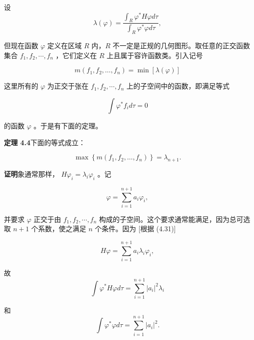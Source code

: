 设
\begin{equation*}
\lambda (\varphi) = \frac {\int_ {R} \varphi^ {*} H \varphi d \tau}{\int_ {R} \varphi^ {*} \varphi d \tau},\tag{4.28}
\end{equation*}

但现在函数 $\varphi$ 定义在区域 $R$ 内，$R$ 不一定是正规的几何图形。取任意的正交函数集合 $f_{1}, f_{2}, \cdots, f_{n}$ ，它们定义在 $R$ 上且属于容许函数类。引入记号

\begin{equation*}
m \left(f _ {1}, f _ {2}, \dots , f _ {n}\right) = \min [ \lambda (\varphi) ]\tag{4.29}
\end{equation*}

这里所有的 $\varphi$ 为正交于张在 $f_{1}, f_{2}, \cdots, f_{n}$ 上的子空间中的函数，即满足等式

\begin{equation*}
\int \varphi^ {*} f _ {i} d \tau = 0
\end{equation*}

的函数 $\varphi$ 。于是有下面的定理。

\textbf{定理 4.4}\quad 下面的等式成立：

\begin{equation*}
\max \left\{m (f _ {1}, f _ {2}, \dots , f _ {n}) \right\} = \lambda_ {n + 1}.\tag{4.30}
\end{equation*}

\textbf{证明}\quad 象通常那样， $H\varphi_{i} = \lambda_{i}\varphi_{i}$ 。记

\begin{equation*}
\varphi = \sum_ {i = 1} ^ {n + 1} a _ {i} \varphi_ {i},\tag{4.31}
\end{equation*}

并要求 $\varphi$ 正交于由 $f_{1}, f_{2}, \cdots, f_{n}$ 构成的子空间。这个要求通常能满足，因为总可选取 $n+1$ 个系数，使之满足 $n$ 个条件。因为 [根据 (4.31)]

\begin{equation*}
H \varphi = \sum_ {i = 1} ^ {n + 1} a _ {i} \lambda_ {i} \varphi_ {i},
\end{equation*}

故
\begin{equation*}
\int \varphi^ {*} H \varphi d \tau = \sum_ {i = 1} ^ {n + 1} | a _ {i} | ^ {2} \lambda_ {i}\tag{4.32}
\end{equation*}

和
\begin{equation*}
\int \varphi^ {*} \varphi d \tau = \sum_ {i = 1} ^ {n + 1} | a _ {i} | ^ {2}.\tag{4.33}
\end{equation*}

